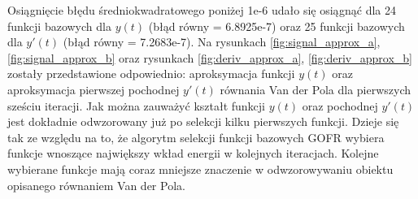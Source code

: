 Osiągnięcie błędu średniokwadratowego poniżej 1e-6 udało się osiągnąć dla 24 funkcji bazowych dla $y(t)$ (błąd równy = 6.8925e-7) oraz 25 funkcji bazowych dla $y'(t)$ (błąd równy = 7.2683e-7). Na rysunkach \ref{fig:signal_approx_a}, \ref{fig:signal_approx_b} oraz rysunkach \ref{fig:deriv_approx_a}, \ref{fig:deriv_approx_b} zostały przedstawione odpowiednio: aproksymacja funkcji $y(t)$ oraz aproksymacja pierwszej pochodnej $y'(t)$ równania Van der Pola  dla pierwszych sześciu iteracji. Jak można zauważyć kształt funkcji $y(t)$ oraz pochodnej $y'(t)$ jest dokładnie odwzorowany już po selekcji kilku pierwszych funkcji. Dzieje się tak ze względu na to, że algorytm selekcji funkcji bazowych GOFR wybiera funkcje wnoszące największy wkład energii w kolejnych iteracjach. Kolejne wybierane funkcje mają coraz mniejsze znaczenie w odwzorowywaniu obiektu opisanego równaniem Van der Pola.


